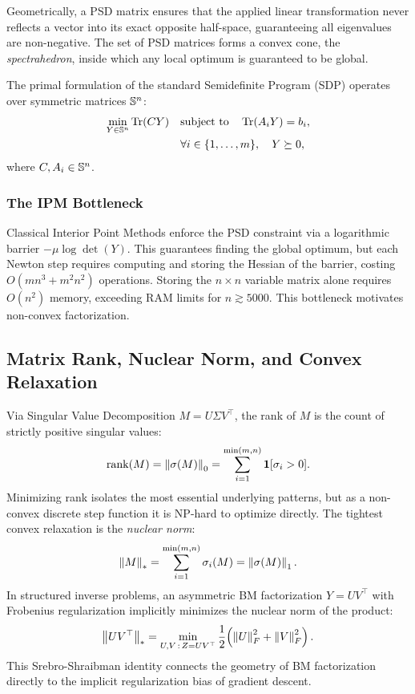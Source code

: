 Geometrically, a PSD matrix ensures that the applied linear transformation never reflects a
vector into its exact opposite half-space, guaranteeing all eigenvalues are non-negative.
The set of PSD matrices forms a convex cone, the \emph{spectrahedron}, inside which any
local optimum is guaranteed to be global.

The primal formulation of the standard Semidefinite Program (SDP) operates over symmetric
matrices $\mathbb{S}^n$:
\begin{equation}
\begin{aligned}
  \min_{Y \in \mathbb{S}^n} \operatorname{Tr}(CY) \quad &\text{subject to} \quad \operatorname{Tr}(A_i Y) = b_i,\\
  &\forall i \in \{1,\ldots,m\}, \quad Y \succeq 0,
\end{aligned}
  \label{eq:primal_sdp}
\end{equation}
where $C, A_i \in \mathbb{S}^n$.

\subsubsection{The IPM Bottleneck}
Classical Interior Point Methods enforce the PSD constraint
via a logarithmic barrier $-\mu \log\det(Y)$. This guarantees finding the global
optimum, but each Newton step requires computing and storing the Hessian of the barrier, costing
$O(mn^3 + m^2 n^2)$ operations. Storing the $n\times n$ variable matrix alone requires
$O(n^2)$ memory, exceeding RAM limits for $n \gtrsim 5000$. This bottleneck motivates
non-convex factorization.

\subsection{Matrix Rank, Nuclear Norm, and Convex Relaxation}

Via Singular Value Decomposition $M = U\Sigma V^\top$, the rank of $M$ is the count of
strictly positive singular values:
\begin{equation}
  \operatorname{rank}(M) = \left\lVert\sigma(M)\right\rVert_0 = \sum_{i=1}^{\min(m,n)} \mathbf{1}[\sigma_i > 0].
\end{equation}
Minimizing rank isolates the most essential underlying patterns, but as a non-convex
discrete step function it is NP-hard to optimize directly. The tightest convex relaxation
is the \emph{nuclear norm}:
\begin{equation}
  \left\lVert M\right\rVert_* = \sum_{i=1}^{\min(m,n)} \sigma_i(M) = \left\lVert\sigma(M)\right\rVert_1.
\end{equation}
In structured inverse problems, an asymmetric BM factorization $Y = UV^\top$ with
Frobenius regularization implicitly minimizes the nuclear norm of the product:
\begin{equation}
  \left\lVert UV^\top\right\rVert_* = \min_{U,V\,:\,Z = UV^\top}
  \frac{1}{2}\!\left(\left\lVert U\right\rVert_F^2 + \left\lVert V\right\rVert_F^2\right).
  \label{eq:nuclear_identity}
\end{equation}
This Srebro-Shraibman identity connects the geometry of BM factorization directly to the
implicit regularization bias of gradient descent.

